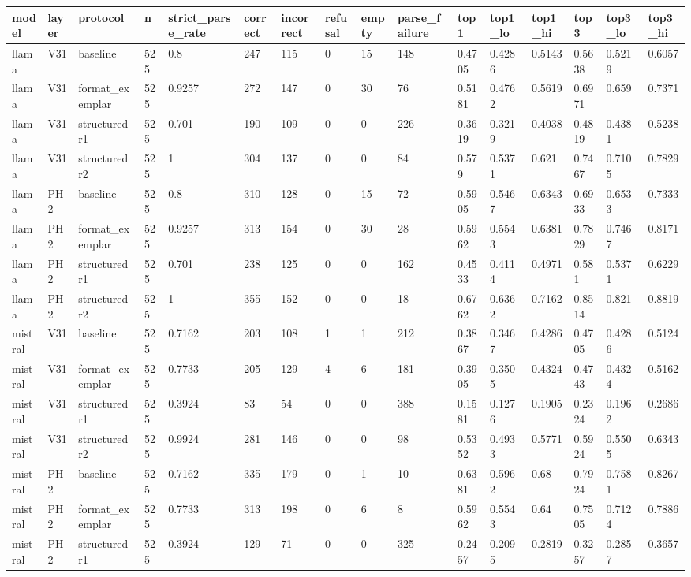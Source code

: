 \begin{tabular}{llllllllllllllll}
\toprule
model & layer & protocol & n & strict\_parse\_rate & correct & incorrect & refusal & empty & parse\_failure & top1 & top1\_lo & top1\_hi & top3 & top3\_lo & top3\_hi \\
\midrule
llama & V31 & baseline & 525 & 0.8 & 247 & 115 & 0 & 15 & 148 & 0.4705 & 0.4286 & 0.5143 & 0.5638 & 0.5219 & 0.6057 \\
llama & V31 & format\_exemplar & 525 & 0.9257 & 272 & 147 & 0 & 30 & 76 & 0.5181 & 0.4762 & 0.5619 & 0.6971 & 0.659 & 0.7371 \\
llama & V31 & structured r1 & 525 & 0.701 & 190 & 109 & 0 & 0 & 226 & 0.3619 & 0.3219 & 0.4038 & 0.4819 & 0.4381 & 0.5238 \\
llama & V31 & structured r2 & 525 & 1 & 304 & 137 & 0 & 0 & 84 & 0.579 & 0.5371 & 0.621 & 0.7467 & 0.7105 & 0.7829 \\
llama & PH2 & baseline & 525 & 0.8 & 310 & 128 & 0 & 15 & 72 & 0.5905 & 0.5467 & 0.6343 & 0.6933 & 0.6533 & 0.7333 \\
llama & PH2 & format\_exemplar & 525 & 0.9257 & 313 & 154 & 0 & 30 & 28 & 0.5962 & 0.5543 & 0.6381 & 0.7829 & 0.7467 & 0.8171 \\
llama & PH2 & structured r1 & 525 & 0.701 & 238 & 125 & 0 & 0 & 162 & 0.4533 & 0.4114 & 0.4971 & 0.581 & 0.5371 & 0.6229 \\
llama & PH2 & structured r2 & 525 & 1 & 355 & 152 & 0 & 0 & 18 & 0.6762 & 0.6362 & 0.7162 & 0.8514 & 0.821 & 0.8819 \\
mistral & V31 & baseline & 525 & 0.7162 & 203 & 108 & 1 & 1 & 212 & 0.3867 & 0.3467 & 0.4286 & 0.4705 & 0.4286 & 0.5124 \\
mistral & V31 & format\_exemplar & 525 & 0.7733 & 205 & 129 & 4 & 6 & 181 & 0.3905 & 0.3505 & 0.4324 & 0.4743 & 0.4324 & 0.5162 \\
mistral & V31 & structured r1 & 525 & 0.3924 & 83 & 54 & 0 & 0 & 388 & 0.1581 & 0.1276 & 0.1905 & 0.2324 & 0.1962 & 0.2686 \\
mistral & V31 & structured r2 & 525 & 0.9924 & 281 & 146 & 0 & 0 & 98 & 0.5352 & 0.4933 & 0.5771 & 0.5924 & 0.5505 & 0.6343 \\
mistral & PH2 & baseline & 525 & 0.7162 & 335 & 179 & 0 & 1 & 10 & 0.6381 & 0.5962 & 0.68 & 0.7924 & 0.7581 & 0.8267 \\
mistral & PH2 & format\_exemplar & 525 & 0.7733 & 313 & 198 & 0 & 6 & 8 & 0.5962 & 0.5543 & 0.64 & 0.7505 & 0.7124 & 0.7886 \\
mistral & PH2 & structured r1 & 525 & 0.3924 & 129 & 71 & 0 & 0 & 325 & 0.2457 & 0.2095 & 0.2819 & 0.3257 & 0.2857 & 0.3657 \\

\end{tabular}
